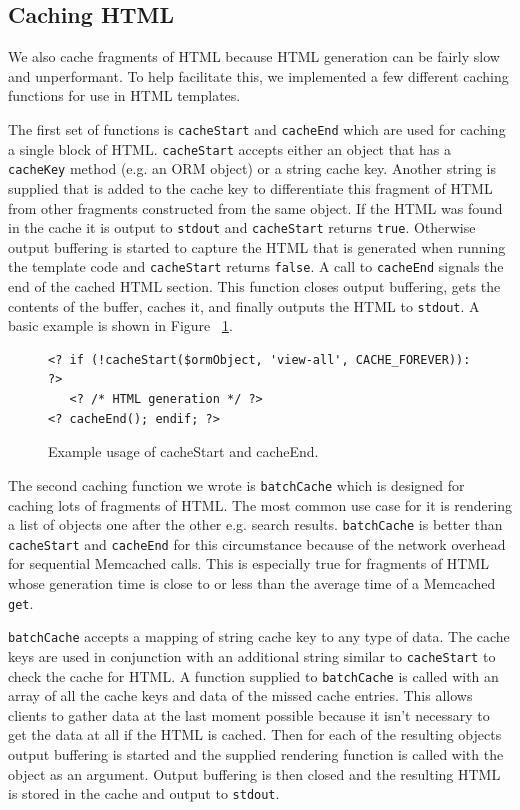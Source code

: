 \documentclass[12pt]{ucthesis}
\begin{document}
\subsection{Caching HTML}
We also cache fragments of HTML because HTML generation can be fairly slow and unperformant.
To help facilitate this, we implemented a few different caching functions for use in HTML templates.

The first set of functions is {\tt cacheStart} and {\tt cacheEnd} which are used for caching a single block of HTML.
{\tt cacheStart} accepts either an object that has a {\tt cacheKey} method (e.g. an ORM object) or a string cache key.
Another string is supplied that is added to the cache key to differentiate this fragment of HTML from other fragments constructed from the same object.
If the HTML was found in the cache it is output to {\tt stdout} and {\tt cacheStart} returns {\tt true}.
Otherwise output buffering is started to capture the HTML that is generated when running the template code and {\tt cacheStart} returns {\tt false}.
A call to {\tt cacheEnd} signals the end of the cached HTML section.
This function closes output buffering, gets the contents of the buffer, caches it, and finally outputs the HTML to {\tt stdout}.
A basic example is shown in Figure ~\ref{fig:cacheStartExample}.

\begin{figure}[h]
\begin{ssp}
\begin{verbatim}
<? if (!cacheStart($ormObject, 'view-all', CACHE_FOREVER)): ?>
   <? /* HTML generation */ ?>
<? cacheEnd(); endif; ?>
\end{verbatim}
\end{ssp}
\caption{Example usage of cacheStart and cacheEnd.}
\label{fig:cacheStartExample}
\end{figure}

The second caching function we wrote is {\tt batchCache} which is designed for caching lots of fragments of HTML.
The most common use case for it is rendering a list of objects one after the other e.g. search results.
{\tt batchCache} is better than {\tt cacheStart} and {\tt cacheEnd} for this circumstance because of the network overhead for sequential {\textsf Memcached} calls.
This is especially true for fragments of HTML whose generation time is close to or less than the average time of a {\textsf Memcached} {\tt get}.

{\tt batchCache} accepts a mapping of string cache key to any type of data.
The cache keys are used in conjunction with an additional string similar to {\tt cacheStart} to check the cache for HTML.
A function supplied to {\tt batchCache} is called with an array of all the cache keys and data of the missed cache entries.
This allows clients to gather data at the last moment possible because it isn't necessary to get the data at all if the HTML is cached.
Then for each of the resulting objects output buffering is started and the supplied rendering function is called with the object as an argument.
Output buffering is then closed and the resulting HTML is stored in the cache and output to {\tt stdout}.
\end{document}
